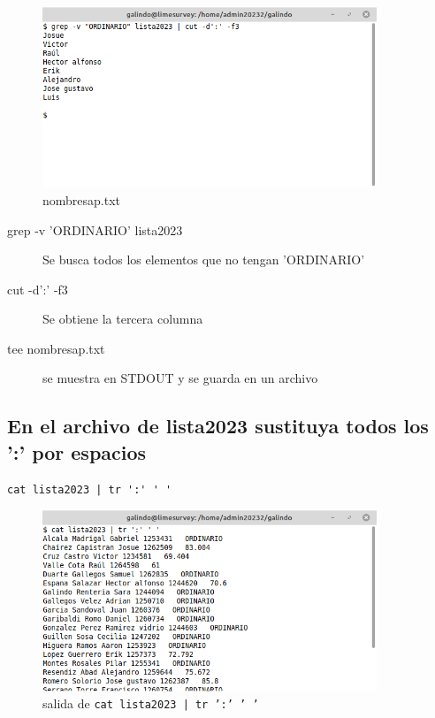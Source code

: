 \documentclass[11pt]{article}
\begin{document}
\begin{figure}[htbp]
\centering
\includegraphics[width=10cm]{img/a8.png}
\caption{nombresap.txt}
\end{figure}


\begin{description}
\item[{grep -v 'ORDINARIO' lista2023}] Se busca todos los elementos que no tengan 'ORDINARIO'
\item[{cut -d':' -f3}] Se obtiene la tercera columna
\item[{tee nombresap.txt}] se muestra en STDOUT y se guarda en un archivo
\end{description}

\pagebreak

\subsection{En el archivo de lista2023 sustituya todos los ':' por espacios}
\label{sec:org30b8bad}
\begin{verbatim}
cat lista2023 | tr ':' ' '
\end{verbatim}

\begin{figure}[htbp]
\centering
\includegraphics[width=10cm]{img/8.png}
\caption[\texttt{cat lista2023 | tr ':' ' '}]{salida de \texttt{cat lista2023 | tr ':' ' '}}
\end{figure}
\end{document}
